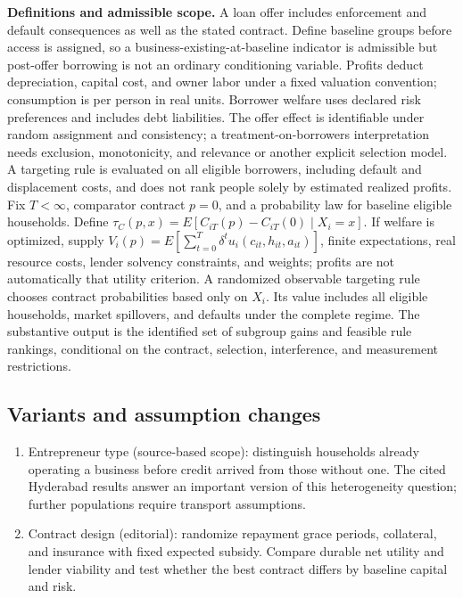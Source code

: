 \documentclass[11pt,a4paper]{article}
\begin{document}
\textbf{Definitions and admissible scope.} A loan offer includes enforcement and default consequences as well as the stated contract. Define baseline groups before access is assigned, so a business-existing-at-baseline indicator is admissible but post-offer borrowing is not an ordinary conditioning variable. Profits deduct depreciation, capital cost, and owner labor under a fixed valuation convention; consumption is per person in real units. Borrower welfare uses declared risk preferences and includes debt liabilities. The offer effect is identifiable under random assignment and consistency; a treatment-on-borrowers interpretation needs exclusion, monotonicity, and relevance or another explicit selection model. A targeting rule is evaluated on all eligible borrowers, including default and displacement costs, and does not rank people solely by estimated realized profits. Fix \(T<\infty\), comparator contract \(p=0\), and a probability law for baseline eligible households. Define \(\tau_C(p,x)=E[C_{iT}(p)-C_{iT}(0)\mid X_i=x]\). If welfare is optimized, supply \(V_i(p)=E[\sum_{t=0}^T\delta^t u_i(c_{it},h_{it},a_{it})]\), finite expectations, real resource costs, lender solvency constraints, and weights; profits are not automatically that utility criterion. A randomized observable targeting rule chooses contract probabilities based only on \(X_i\). Its value includes all eligible households, market spillovers, and defaults under the complete regime. The substantive output is the identified set of subgroup gains and feasible rule rankings, conditional on the contract, selection, interference, and measurement restrictions.
\subsection*{Variants and assumption changes}
\begin{enumerate}
\item Entrepreneur type (source-based scope): distinguish households already operating a business before credit arrived from those without one. The cited Hyderabad results answer an important version of this heterogeneity question; further populations require transport assumptions.
\item Contract design (editorial): randomize repayment grace periods, collateral, and insurance with fixed expected subsidy. Compare durable net utility and lender viability and test whether the best contract differs by baseline capital and risk.
\end{enumerate}
\end{document}
